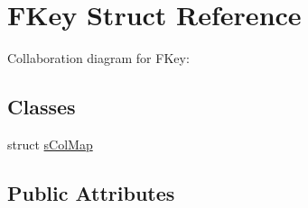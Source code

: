 \hypertarget{struct_f_key}{\section{F\+Key Struct Reference}
\label{struct_f_key}
}


Collaboration diagram for F\+Key\+:
\subsection*{Classes}
\begin{DoxyCompactItemize}
\item 
struct \hyperlink{struct_f_key_1_1s_col_map}{s\+Col\+Map}
\end{DoxyCompactItemize}
\subsection*{Public Attributes}
